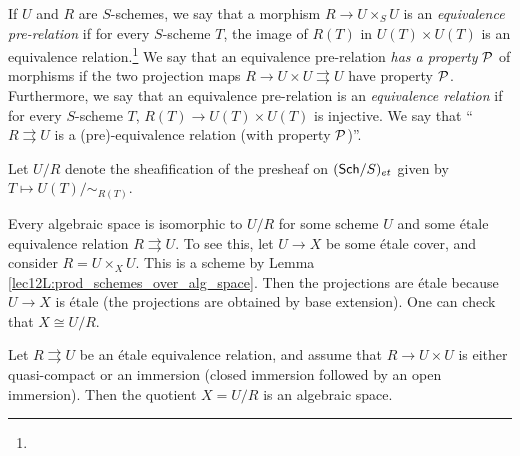  \begin{definition}
   If $U$ and $R$ are $S$-schemes, we say that a morphism $R\to U\times_S U$ is an
   \emph{equivalence pre-relation} if for every $S$-scheme $T$, the image of $R(T)$ in
   $U(T)\times U(T)$ is an equivalence relation.\footnote{} We say that an equivalence pre-relation \emph{has a property} $\P$ of
   morphisms if the two projection maps $R\to U\times U\rightrightarrows U$ have property
   $\P$. Furthermore, we say that an equivalence pre-relation is an \emph{equivalence
   relation} if for every $S$-scheme $T$, $R(T)\to U(T)\times U(T)$ is injective. We say
   that ``$R\rightrightarrows U$ is a (pre)-equivalence relation (with property $\P$)''.
 \end{definition}
  Let $U/R$ denote the sheafification of the presheaf on $(\sch/S)_{et}$
 given by $T\mapsto U(T)/\sim_{R(T)}$.
 \begin{remark}
   Every algebraic space is isomorphic to $U/R$ for some scheme $U$ and some \'etale
   equivalence relation $R\rightrightarrows U$. To see this, let $U\to X$ be some \'etale
   cover, and consider $R=U\times_X U$. This is a scheme by Lemma
   \ref{lec12L:prod_schemes_over_alg_space}. Then the projections are \'etale because
   $U\to X$ is \'etale (the projections are obtained by base extension). One can check
   that $X\cong U/R$. 
 \end{remark}
 \begin{proposition} \label{lec12P:U/R_alg_space}
   Let $R\rightrightarrows U$ be an \'etale equivalence relation, and assume that $R\to
   U\times U$ is either quasi-compact or an immersion (closed immersion followed by an
   open immersion). Then the quotient $X=U/R$ is an algebraic space.
 \end{proposition}
